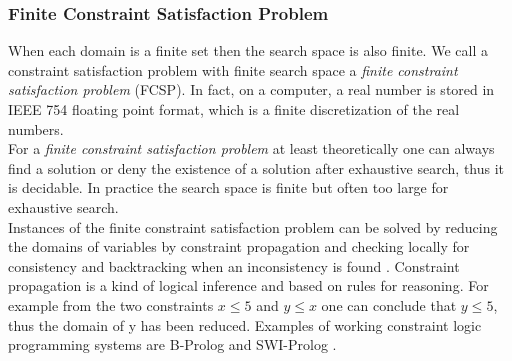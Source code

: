 \subsubsection{Finite Constraint Satisfaction Problem}
When each domain is a finite set then the search space is also finite. We call a constraint satisfaction problem with finite search space a \emph{finite constraint satisfaction problem} (FCSP). In fact, on a computer, a real number is stored in IEEE 754 floating point format, which is a finite discretization of the real numbers.\\
For a \emph{finite constraint satisfaction problem} at least theoretically one can always find a solution or deny the existence of a solution after exhaustive search, thus it is decidable. In practice the search space is finite but often too large for exhaustive search.\\
Instances of the finite constraint satisfaction problem can be solved by reducing the domains of variables by constraint propagation and checking locally for consistency and backtracking when an inconsistency is found \cite{ConstraintPropagation}. Constraint propagation is a kind of logical inference and based on rules for reasoning. For example from the two constraints $x\leq 5$ and $y \leq x$ one can conclude that $y\leq 5$, thus the domain of y has been reduced. Examples of working constraint logic programming systems are B-Prolog and SWI-Prolog \cite{wielemaker2011SWIProlog}.
